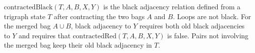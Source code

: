 \(\mathrm{contractedBlack}(T,A,B,X,Y)\) is the black adjacency relation
defined from a trigraph state \(T\) after contracting the two bags \(A\) and
\(B\).  Loops are not black.  For the merged bag \(A\cup B\), black adjacency
to \(Y\) requires both old black adjacencies to \(Y\) and requires that
\(\mathrm{contractedRed}(T,A,B,X,Y)\) is false.  Pairs not involving the
merged bag keep their old black adjacency in \(T\).
